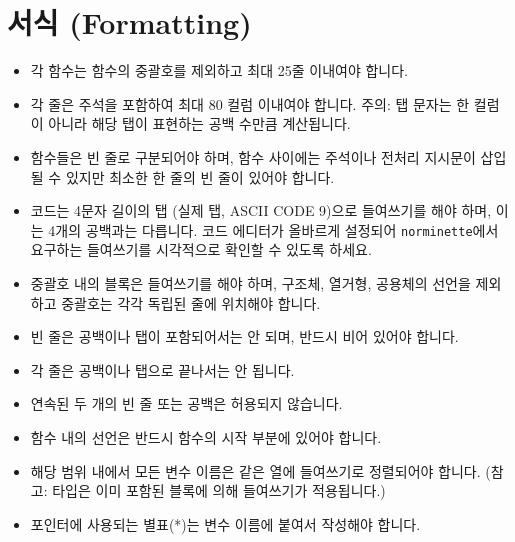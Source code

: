 \documentclass{42-ko}
\begin{document}
    \section{서식 (Formatting)}

            \begin{itemize}

                \item 각 함수는 함수의 중괄호를 제외하고 최대 25줄 이내여야 합니다.

                \item 각 줄은 주석을 포함하여 최대 80 컬럼 이내여야 합니다. 
                  주의: 탭 문자는 한 컬럼이 아니라 해당 탭이 표현하는 공백 수만큼 
                  계산됩니다.

                \item 함수들은 빈 줄로 구분되어야 하며, 함수 사이에는 주석이나 
                  전처리 지시문이 삽입될 수 있지만 최소한 한 줄의 빈 줄이 있어야 
                  합니다.

                \item 코드는 4문자 길이의 탭 (실제 탭, ASCII CODE 9)으로 
                  들여쓰기를 해야 하며, 이는 4개의 공백과는 다릅니다. 코드 
                  에디터가 올바르게 설정되어 \texttt{norminette}에서 요구하는 들여쓰기를 
                  시각적으로 확인할 수 있도록 하세요.

                \item 중괄호 { } 내의 블록은 들여쓰기를 해야 하며, 구조체, 열거형, 
                  공용체의 선언을 제외하고 중괄호는 각각 독립된 줄에 위치해야 합니다.

                \item 빈 줄은 공백이나 탭이 포함되어서는 안 되며, 반드시 비어 있어야 합니다.

                \item 각 줄은 공백이나 탭으로 끝나서는 안 됩니다.

                \item 연속된 두 개의 빈 줄 또는 공백은 허용되지 않습니다.

                \item 함수 내의 선언은 반드시 함수의 시작 부분에 있어야 합니다.

                \item 해당 범위 내에서 모든 변수 이름은 같은 열에 들여쓰기로 정렬되어야 합니다.
                  (참고: 타입은 이미 포함된 블록에 의해 들여쓰기가 적용됩니다.)

                \item 포인터에 사용되는 별표(*)는 변수 이름에 붙여서 작성해야 합니다.


\end{itemize}
\end{document}
